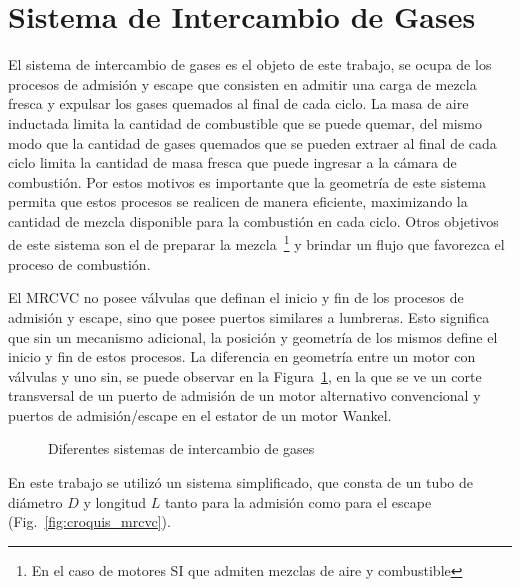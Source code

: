 \section{Sistema de Intercambio de Gases}
%
El sistema de intercambio de gases es el objeto de este trabajo, se ocupa de
los procesos de admisión y escape que consisten en admitir una carga de mezcla
fresca y expulsar los gases quemados al final de cada ciclo.
%
La masa de aire inductada limita la cantidad de combustible que se puede
quemar, del mismo modo que la cantidad de gases quemados que se pueden extraer
al final de cada ciclo limita la cantidad de masa fresca que puede ingresar a
la cámara de combustión.
%
Por estos motivos es importante que la geometría de este sistema permita que
estos procesos se realicen de manera eficiente, maximizando la cantidad de
mezcla disponible para la combustión en cada ciclo.
%
Otros objetivos de este sistema son el de preparar la mezcla~\footnote{En el
caso de motores SI que admiten mezclas de aire y combustible} y brindar un
flujo que favorezca el proceso de combustión.


El MRCVC no posee válvulas que definan el inicio y fin de los procesos de
admisión y escape, sino que posee puertos similares a lumbreras.
%
Esto significa que sin un mecanismo adicional, la posición y geometría de los
mismos define el inicio y fin de estos procesos.
%
La diferencia en geometría entre un motor con válvulas y uno sin, se puede
observar en la Figura~\ref{fig:puerto_valvula}, en la que se ve un corte
transversal de un puerto de admisión de un motor alternativo convencional y
puertos de admisión/escape en el estator de un motor Wankel.

\begin{figure}
  \centering
  \caption{Diferentes sistemas de intercambio de gases}\label{fig:puerto_valvula}
\end{figure}


En este trabajo se utilizó un sistema simplificado, que consta de un tubo de
diámetro $D$ y longitud $L$ tanto para la admisión como para el escape
(Fig.~\ref{fig:croquis_mrcvc}).


